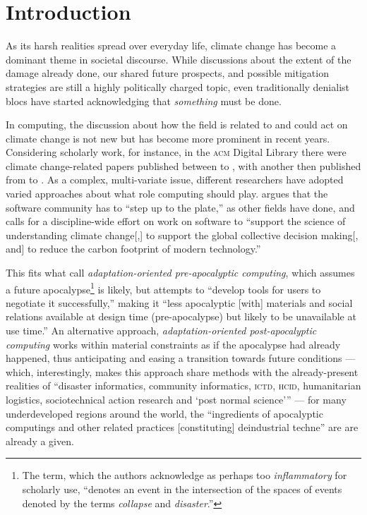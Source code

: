 \section{Introduction}

As its harsh realities spread %
over everyday life, climate change has become a dominant theme in societal discourse. While discussions about the extent of the damage already done, our shared future prospects, and possible mitigation strategies are still a highly politically charged topic, even traditionally denialist blocs have started acknowledging that \emph{something} must be done. \cite{teirstein_2021} 

In computing, the discussion about how the field is related to and could act on climate change is not new but has become more prominent in recent years. Considering scholarly work, for instance, in the \textsc{acm} Digital Library there were  climate change-related papers published between  to , with another  then published from  to . \cite{ferreiraClimateChangeCommunication2021} As a complex, multi-variate issue, different researchers have adopted varied approaches about what role computing should play. \citet{easterbrook2010climate} argues that the software community has to ``step up to the plate,'' as other fields have done, and calls for a discipline-wide effort on work on software to ``support the science of understanding climate change[,] to support the global collective decision making[, and] to reduce the carbon footprint of modern technology.''

This fits what \citet{silberman2010precarious} call \emph{adaptation-oriented pre-apocalyptic computing}, which assumes a future apocalypse\footnote{The term, which the authors acknowledge as perhaps too \emph{inflammatory} for scholarly use, ``denotes an event in the intersection of the spaces of events denoted by the terms \emph{collapse} and \emph{disaster}.''} is likely, but attempts to ``develop tools for users to negotiate it successfully,'' making it ``less apocalyptic [with] materials and social relations available at design time (pre-apocalypse) but likely to be unavailable at use time.'' An alternative approach, \emph{adaptation-oriented post-apocalyptic computing} works within material constraints as if the apocalypse had already happened, thus anticipating and easing a transition towards future conditions --- which, interestingly, makes this approach share methods with the already-present realities of ``disaster informatics, community informatics, \textsc{ictd}, \textsc{hcid}, humanitarian logistics, sociotechnical action research and `post normal science''' --- for many underdeveloped regions around the world, the ``ingredients of apocalyptic computings and other related practices [constituting] deindustrial techne'' are are already a given.

